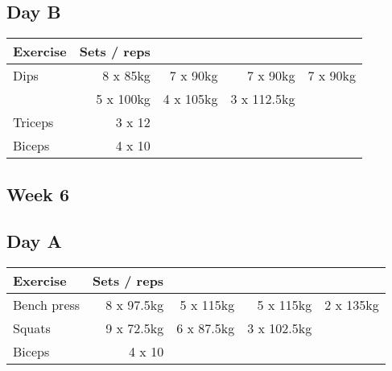 \documentclass[12pt, a4paper]{article}%
\begin{document}
  \subsection*{\hspace{0.5em} Day B }


  \begin{tabular}{l|rrrr}
  \hspace{0.75em} \textbf{Exercise} & \textbf{Sets / reps} \\ \hline

            \hspace{0.75em} Dips
            & 8 x 85kg
            & 7 x 90kg
            & 7 x 90kg
            & 7 x 90kg
            \\


            \hspace{0.75em}
            & 5 x 100kg
            & 4 x 105kg
            & 3 x 112.5kg
            & 
            \\


   \hspace{0.75em} Triceps & 3 x 12 \\
   \hspace{0.75em} Biceps & 4 x 10 \\
  \end{tabular}

 \subsection*{\hspace{0.25em} Week 6 }
  \subsection*{\hspace{0.5em} Day A }


  \begin{tabular}{l|rrrr}
  \hspace{0.75em} \textbf{Exercise} & \textbf{Sets / reps} \\ \hline

            \hspace{0.75em} Bench press
            & 8 x 97.5kg
            & 5 x 115kg
            & 5 x 115kg
            & 2 x 135kg
            \\


            \hspace{0.75em} Squats
            & 9 x 72.5kg
            & 6 x 87.5kg
            & 3 x 102.5kg
            & 
            \\


   \hspace{0.75em} Biceps & 4 x 10 \\
  \end{tabular}
\end{document}
